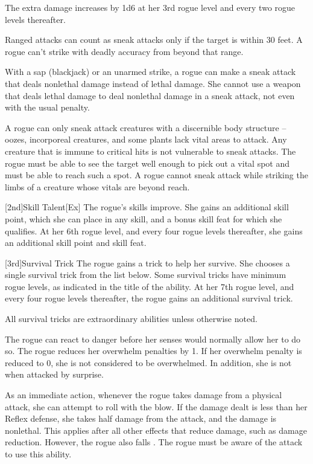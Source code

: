 The extra damage increases by 1d6 at her 3rd rogue level and every two rogue levels thereafter.

\par Ranged attacks can count as sneak attacks only if the target is within 30 feet.
A rogue can't strike with deadly accuracy from beyond that range.

With a sap (blackjack) or an unarmed strike, a rogue can make a sneak attack that deals nonlethal damage instead of lethal damage.
She cannot use a weapon that deals lethal damage to deal nonlethal damage in a sneak attack, not even with the usual  penalty.

A rogue can only sneak attack creatures with a discernible body structure -- oozes, incorporeal creatures, and some plants lack vital areas to attack.
Any creature that is immune to critical hits is not vulnerable to sneak attacks.
The rogue must be able to see the target well enough to pick out a vital spot and must be able to reach such a spot.
A rogue cannot sneak attack while striking the limbs of a creature whose vitals are beyond reach.

[2nd]{Skill Talent}[Ex]
The rogue's skills improve.
She gains an additional skill point, which she can place in any skill, and a bonus skill feat for which she qualifies.
At her 6th rogue level, and every four rogue levels thereafter, she gains an additional skill point and skill feat.

[3rd]{Survival Trick}
The rogue gains a trick to help her survive.
She chooses a single survival trick from the list below.
Some survival tricks have minimum rogue levels, as indicated in the title of the ability.
At her 7th rogue level, and every four rogue levels thereafter, the rogue gains an additional survival trick.

All survival tricks are extraordinary abilities unless otherwise noted.

The rogue can react to danger before her senses would normally allow her to do so.
The rogue reduces her overwhelm penalties by 1.
If her overwhelm penalty is reduced to 0, she is not considered to be overwhelmed.
In addition, she is not \unaware when attacked by surprise.

As an immediate action, whenever the rogue takes damage from a physical attack, she can attempt to roll with the blow.
If the damage dealt is less than her Reflex defense, she takes half damage from the attack, and the damage is nonlethal.
This applies after all other effects that reduce damage, such as damage reduction.
However, the rogue also falls \prone.
The rogue must be aware of the attack to use this ability.

